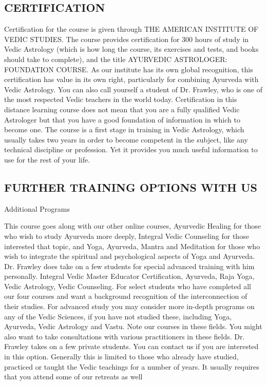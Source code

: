 \subsection{CERTIFICATION}
  Certification for the course is given through THE AMERICAN INSTITUTE OF VEDIC STUDIES. The course provides certification for 300 hours of study in Vedic Astrology (which is how long the course, its exercises and tests, and books should take to complete), and the title AYURVEDIC ASTROLOGER: FOUNDATION COURSE.   As our institute has its own global recognition, this certification has value in its own right, particularly for combining Ayurveda with Vedic Astrology. You can also call yourself a student of Dr. Frawley, who is one of the most respected Vedic teachers in the world today.   Certification in this distance learning course does not mean that you are a fully qualified Vedic Astrologer but that you have a good foundation of information in which to become one. The course is a first stage in training in Vedic Astrology, which usually takes two years in order to become competent in the subject, like any technical discipline or profession. Yet it provides you much useful information to use for the rest of your life.  

\subsection{FURTHER TRAINING OPTIONS WITH US} Additional Programs

This course goes along with our other online courses, Ayurvedic Healing for those who wish to study Ayurveda more deeply, Integral Vedic Counseling for those interested that topic, and Yoga, Ayurveda, Mantra and Meditation for those who wish to integrate the spiritual and psychological aspects of Yoga and Ayurveda.
Dr. Frawley does take on a few students for special advanced training with him personally.
Integral Vedic Master Educator Certification, Ayurveda, Raja Yoga, Vedic Astrology, Vedic Counseling. For select students who have completed all our four courses and want a background recognition of the interconnection of their studies.
For advanced study you may consider more in-depth programs on any of the Vedic Sciences, if you have not studied these, including Yoga, Ayurveda, Vedic Astrology and Vastu. Note our courses in these fields. You might also want to take consultations with various practitioners in these fields. Dr. Frawley takes on a few private students. You can contact us if you are interested in this option. Generally this is limited to those who already have studied, practiced or taught the Vedic teachings for a number of years. It usually requires that you attend some of our retreats as well

